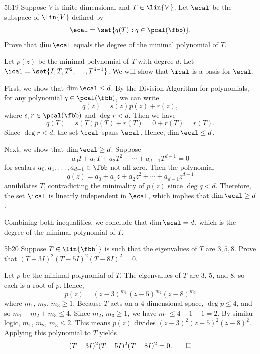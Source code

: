 \begin{exercise}{5b19}
    Suppose $V$ is finite-dimensional and $T \in \lin{V}$.
	Let $\ecal$ be the subspace of $\lin{V}$ defined by
    \[
    	\ecal = \set{q(T) : q \in \pcal(\fbb)}.
    \]
    Prove that $\dim \ecal$ equals the degree of the minimal polynomial of $T$.
\end{exercise}

\begin{sol}
    Let $p(z)$ be the minimal polynomial of $T$ with degree $d$.
    Let $\ical = \set{I, T, T^2, \ldots, T^{d-1}}$.
    We will show that $\ical$ is a basis for $\ecal$.

    First, we show that $\dim \ecal \leq d$.
    By the Division Algorithm for polynomials, for any polynomial $q \in \pcal(\fbb)$, we can write
    \[
    	q(z) = s(z)p(z) + r(z),
    \]
    where $s, r \in \pcal(\fbb)$ and $\deg r < d$.
    Then we have
    \[
    	q(T) = s(T)p(T) + r(T) = 0 + r(T) = r(T).
    \]
    Since $\deg r < d$, the set $\ical$ spans $\ecal$.
    Hence, $\dim \ecal \leq d$.

    Next, we show that $\dim \ecal \geq d$.
    Suppose
    \[
    	a_0 I + a_1 T + a_2 T^2 + \cdots + a_{d-1} T^{d-1} = 0
    \]
    for scalars $a_0, a_1, \ldots, a_{d-1} \in \fbb$ not all zero.
    Then the polynomial
    \[
    	q(z) = a_0 + a_1 z + a_2 z^2 + \cdots + a_{d-1} z^{d-1}
    \]
    annihilates $T$, contradicting the minimality of $p(z)$ since $\deg q < d$.
    Therefore, the set $\ical$ is linearly independent in $\ecal$, which implies that $\dim \ecal \geq d$.

    Combining both inequalities, we conclude that $\dim \ecal = d$, which is the degree of the minimal polynomial of $T$.
\end{sol}

\begin{exercise}{5b20}
    Suppose $T \in \lin{\fbb^4}$ is such that the eigenvalues of $T$ are $3, 5, 8$.
	Prove that $(T - 3I)^2(T - 5I)^2(T - 8I)^2 = 0$.
\end{exercise}

\begin{sol}
    Let $p$ be the minimal polynomial of $T$.
    The eigenvalues of $T$ are $3$, $5$, and $8$, so each is a root of $p$.
    Hence,
    \[
    	p(z)=(z-3)^{m_1} (z-5)^{m_2} (z-8)^{m_3}
    \]
    where $m_1$, $m_2$, $m_3 \geq 1$.
    Because $T$ acts on a $4$-dimensional space, $\deg p \leq 4$, and so $m_1+m_2+m_3 \leq 4$.
    Since $m_2$, $m_3 \geq 1$, we have $m_1 \leq 4-1-1=2$.
    By similar logic, $m_1$, $m_2$, $m_3 \leq 2$.
    This means $p(z)$ divides $(z-3)^2 (z-5)^2 (z-8)^2$.
    Applying this polynomial to $T$ yields
    \[
    	(T-3I)^2 (T-5I)^2 (T-8I)^2=0. \qedhere
    \]
\end{sol}

